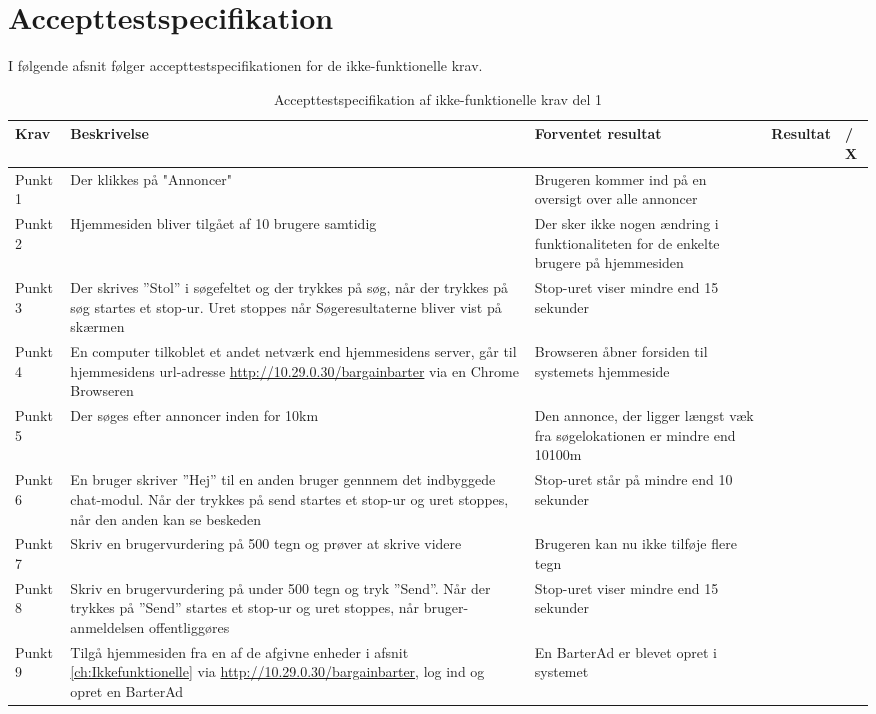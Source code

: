 \chapter{Accepttestspecifikation}\label{ch:Accepttestspecifikation}
I følgende afsnit følger accepttestspecifikationen for de ikke-funktionelle krav.

\setlength{\arrayrulewidth}{0.3mm}
\setlength{\tabcolsep}{2pt}
\renewcommand{\arraystretch}{1.5}
\begin{table}[H]
	\begin{tabular}{ |p{1.4cm}|p{5.0cm}|p{5.0cm}|p{3.8cm}|p{1.0cm}| } 
		\hline
		\textbf{Krav} & \textbf{Beskrivelse} & \textbf{Forventet resultat} & \textbf{Resultat} & \textbf{\checkmark / X} \\
		\hline
		Punkt 1 & Der klikkes på "Annoncer"  & Brugeren kommer ind på en oversigt over alle annoncer &  & \\
		\hline
		Punkt 2 & Hjemmesiden bliver tilgået af 10 brugere samtidig & Der sker ikke nogen ændring i funktionaliteten for de enkelte brugere på hjemmesiden &  &  \\
		\hline
		Punkt 3 & Der skrives ''Stol'' i søgefeltet og der trykkes på søg, når der trykkes på søg startes et stop-ur. Uret stoppes når Søgeresultaterne bliver vist på skærmen & Stop-uret viser mindre end 15 sekunder &  &  \\
		\hline
		Punkt 4 & En computer tilkoblet et andet netværk end hjemmesidens server, går til hjemmesidens url-adresse \url{http://10.29.0.30/bargainbarter} via en Chrome Browseren & Browseren åbner forsiden til systemets hjemmeside  &  & \\
		\hline
		Punkt 5 & Der søges efter annoncer inden for 10km & Den annonce, der ligger længst væk fra søgelokationen er mindre end 10100m &  &  \\
		\hline 
		Punkt 6 & En bruger skriver ''Hej'' til en anden bruger gennnem det indbyggede chat-modul. Når der trykkes på send startes et stop-ur og uret stoppes, når den anden kan se beskeden & Stop-uret står på mindre end 10 sekunder & &  \\
		\hline
		Punkt 7 & Skriv en brugervurdering på 500 tegn og prøver at skrive videre & Brugeren kan nu ikke tilføje flere tegn &  & \\
		\hline
		Punkt 8 & Skriv en brugervurdering på under 500 tegn og tryk ''Send''. Når der trykkes på ''Send'' startes et stop-ur og uret stoppes, når bruger-anmeldelsen offentliggøres & Stop-uret viser mindre end 15 sekunder &  & \\
		\hline
		Punkt 9 & Tilgå hjemmesiden fra en af de afgivne enheder i afsnit \ref{ch:Ikkefunktionelle} via \url{http://10.29.0.30/bargainbarter}, log ind og opret en BarterAd  & En BarterAd er blevet opret i systemet & &  \\
		\hline
	\end{tabular}
	\caption{Accepttestspecifikation af ikke-funktionelle krav del 1}
	\label{table:accepttest_ifk1}
\end{table}


